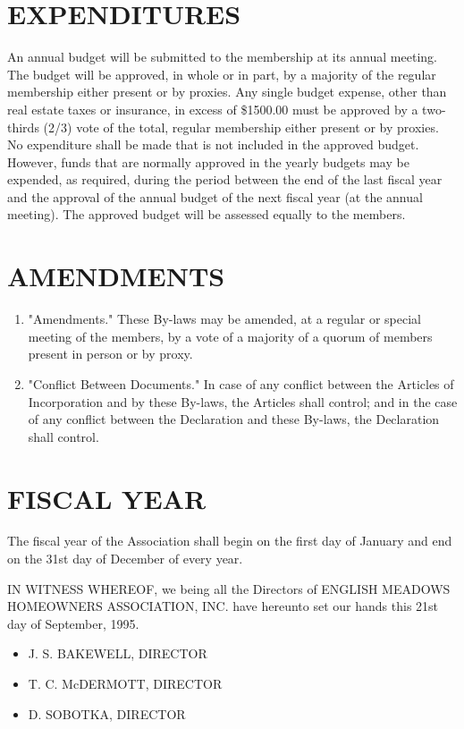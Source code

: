 \documentclass[12pt, letterpaper]{article}
\begin{document}
\section{EXPENDITURES}
  An annual budget will be submitted to the membership at its annual meeting.
  The budget will be approved, in whole or in part, by a majority of the regular membership either present or by proxies.
  Any single budget expense, other than real estate taxes or insurance, in excess of \$1500.00 must be approved by a two-thirds (2/3) vote of the total, regular membership either present or by proxies.
  No expenditure shall be made that is not included in the approved budget.
  However, funds that are normally approved in the yearly budgets may be expended, as required, during the period between the end of the last fiscal year and the approval of the annual budget of the next fiscal year (at the annual meeting).
The approved budget will be assessed equally to the members.

\section{AMENDMENTS}
\begin{enumerate}
 \item "Amendments."
  These By-laws may be amended, at a regular or special meeting of the members, by a vote of a majority of a quorum of members present in person or by proxy.
 \item "Conflict Between Documents."
  In case of any conflict between the Articles of Incorporation and by these By-laws, the Articles shall control; and in the case of any conflict between the Declaration and these By-laws, the Declaration shall control.
\end{enumerate}

\section{FISCAL YEAR}
The fiscal year of the Association shall begin on the first day of January and end on the 31st day of December of every year.

IN WITNESS WHEREOF, we being all the Directors of ENGLISH MEADOWS HOMEOWNERS ASSOCIATION, INC. have hereunto set our hands this 21st day of September, 1995.
\begin{itemize}
 \item J. S. BAKEWELL, DIRECTOR
 \item T. C. McDERMOTT, DIRECTOR
 \item D. SOBOTKA, DIRECTOR
\end{itemize}
\end{document}
